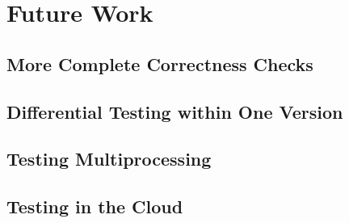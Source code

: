 \section{Future Work}
\label{future}

\subsection{More Complete Correctness Checks}
\label{futureoracle}

\subsection{Differential Testing within One Version}
\label{sec:reftest}

\subsection{Testing Multiprocessing}

\subsection{Testing in the Cloud}
